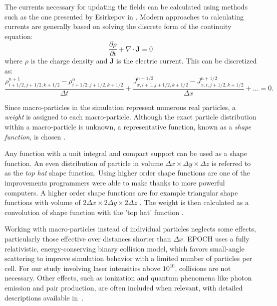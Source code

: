 The currents necessary for updating the fields can be calculated using methods such as the one presented by Esirkepov in \cite{esirkepov2001}. Modern approaches to calculating currents are generally based on solving the discrete form of the continuity equation:
\begin{equation}
	\frac{\partial\rho}{\partial t} + \nabla \cdot \bm{J} = 0
	\label{eq:conti}
\end{equation} 
where $\rho$ is the charge density and $\bm{J}$ is the electric current. This can be discretized as:
\begin{equation}
	\frac{\rho^{n+1}_{i+1/2,j+1/2,k+1/2}-\rho^{n}_{i+1/2,j+1/2,k+1/2}}{\Delta t} + \frac{J^{n+1/2}_{x,i+1,j+1/2,k+1/2}-J^{n+1/2}_{x,i,j+1/2,k+1/2}}{\Delta x} + \dots = 0.
\end{equation}

Since macro-particles in the simulation represent numerous real particles, a \textit{weight} is assigned to each macro-particle. Although the exact particle distribution within a macro-particle is unknown, a representative function, known as a \textit{shape function}, is chosen \cite{arber2015}. 

Any function with a unit integral and compact support can be used as a shape function. An even distribution of particle in volume $\Delta x \times \Delta y \times \Delta z$ is referred to as the \textit{top hat} shape function. Using higher order shape functions are one of the improvements programmers were able to make thanks to more powerful computers. A higher order shape functions are for example triangular shape functions with volume of $2\Delta x \times 2\Delta y \times 2\Delta z$  . The weight is then calculated as a convolution of shape function with the 'top hat' function \cite{arber2015}.

Working with macro-particles instead of individual particles neglects some effects, particularly those effective over distances shorter than $\Delta x$. EPOCH uses a fully relativistic, energy-conserving binary collision model, which favors small-angle scattering to improve simulation behavior with a limited number of particles per cell. For our study involving laser intensities above $10^{10}$, collisions are not necessary. Other effects, such as ionization and quantum phenomena like photon emission and pair production, are often included when relevant, with detailed descriptions available in~\cite{arber2015}.